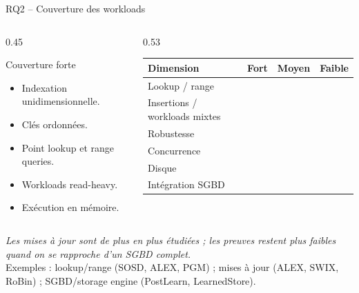 \documentclass[10pt,aspectratio=169]{beamer}
\begin{document}
\begin{frame}{RQ2 -- Couverture des workloads}
  \begin{columns}[T,onlytextwidth]
    \begin{column}{0.45\textwidth}
      \begin{block}{Couverture forte}
        \begin{itemize}
          \item Indexation unidimensionnelle.
          \item Clés ordonnées.
          \item Point lookup et range queries.
          \item Workloads read-heavy.
          \item Exécution en mémoire.
        \end{itemize}
      \end{block}
    \end{column}
    \begin{column}{0.53\textwidth}
      \begin{tabular}{>{\raggedright\arraybackslash}p{3.6cm}ccc}
        \toprule
        \textbf{Dimension} & \textbf{Fort} & \textbf{Moyen} & \textbf{Faible} \\
        \midrule
        Lookup / range & \cellcolor{SoftGreen} & & \\
        Insertions / workloads mixtes & & \cellcolor{SoftOrange} & \\
        Robustesse & & \cellcolor{SoftOrange} & \\
        Concurrence & & & \cellcolor{SoftRed} \\
        Disque & & & \cellcolor{SoftRed} \\
        Intégration SGBD & & & \cellcolor{SoftRed} \\
        \bottomrule
      \end{tabular}
    \end{column}
  \end{columns}

  \vspace{0.3cm}
  \begin{center}
  \small\emph{Les mises à jour sont de plus en plus étudiées ; les preuves restent plus faibles quand on se rapproche d'un SGBD complet.}\\[2pt]
  \tiny Exemples : lookup/range (SOSD, ALEX, PGM) ; mises à jour (ALEX, SWIX, RoBin) ; SGBD/storage engine (PostLearn, LearnedStore).
  \end{center}
\end{frame}
\end{document}

